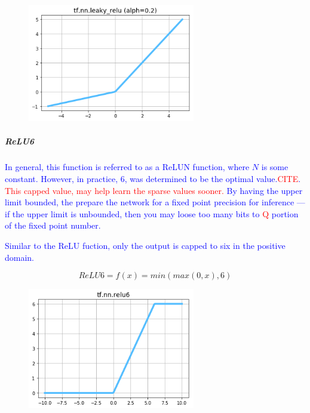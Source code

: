 \begin{figure}
	\centering
	\includegraphics[width=0.65\textwidth]{./sync_imgs/act/notsmooth/leakyrelu.png}
	\label{fig:act_notsmooth_leakyrelu}
\end{figure}

\subparagraph{ReLU6}

\textcolor{blue}{In general, this function is referred to as a {ReLUN} function, where $N$ is some constant. However, in practice, $6$, was determined to be the optimal value.\textcolor{red}{CITE}. \textcolor{red}{This capped value, may help learn the sparse values sooner.} By having the upper limit bounded, the prepare the network for a fixed point precision for inference --- if the upper limit is unbounded, then you may loose too many bits to \textcolor{red}{Q} portion of the fixed point number.}


\textcolor{blue}{Similar to the ReLU fuction, only the output is capped to six in the positive domain.}

\begin{equation}
{
	ReLU6 = f(x) = min{(max{(0,x)},6)}
}
\label{eq:act_ReLU6_def}
\end{equation}

\begin{figure}
	\centering
	\includegraphics[width=0.65\textwidth]{./sync_imgs/act/notsmooth/relu6.png}
	\label{fig:act_notsmooth_relu6}
\end{figure}

